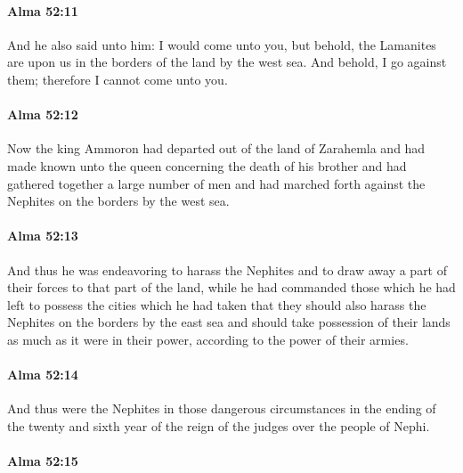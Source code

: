 		\paragraph{Alma 52:11} %
			\label{ALMA-52-11}

			And he also said unto him:
			I would come unto you,
			but behold, the Lamanites are upon us
			in the borders of the land by the west sea.
			And behold, I go against them;
			therefore I cannot come unto you.

		\paragraph{Alma 52:12} %
			\label{ALMA-52-12}

			Now the king Ammoron had departed out of the land of Zarahemla
			and had made known unto the queen concerning the death of his brother
			and had gathered together a large number of men
			and had marched forth against the Nephites on the borders by the west sea.

		\paragraph{Alma 52:13} %
			\label{ALMA-52-13}

			And thus he was endeavoring to harass the Nephites
			and to draw away a part of their forces to that part of the land,
			while he had commanded those which he had left
			to possess the cities which he had taken
			that they should also harass the Nephites on the borders by the east sea
			and should take possession of their lands
			as much as it were in their power,
			according to the power of their armies.

		\paragraph{Alma 52:14} %
			\label{ALMA-52-14}

			And thus were the Nephites in those dangerous circumstances
			in the ending of the twenty and sixth year
			of the reign of the judges over the people of Nephi.

		\paragraph{Alma 52:15} %
			\label{ALMA-52-15}

